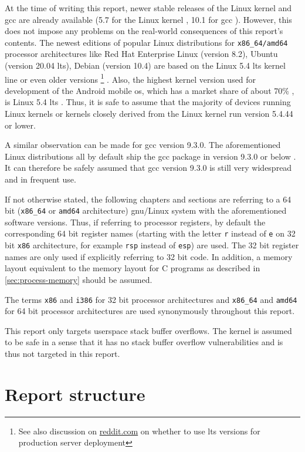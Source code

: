 At the time of writing this report, newer stable releases of the Linux kernel and \gls{gcc} are already available (5.7 for the Linux kernel \cite{LKO2020a}, 10.1 for \gls{gcc} \cite{FSF2020}).
However, this does not impose any problems on the real-world consequences of this report's contents.
The newest editions of popular Linux distributions for \texttt{x86\_64/amd64} processor architectures like Red Hat Enterprise Linux (version 8.2), Ubuntu (version 20.04 \gls{lts}), Debian (version 10.4) are based on the Linux 5.4 \gls{lts} kernel line or even older versions%
	\footnote{See also discussion on \href{https://www.reddit.com/r/webhosting/comments/beg0z0/should_i_use_an_lts_version_of_ubuntu_for_my_web/}{reddit.com} on whether to use \gls{lts} versions for production server deployment}
\cite{RedHat2020,Canonical2020,SPI2020,SPI2020a}.
Also, the highest kernel version used for development of the Android mobile \gls{os}, which has a market share of about 70\% \cite{Statcounter2020}, is Linux 5.4 \gls{lts} \cite{GoogleLLC2020}.
Thus, it is safe to assume that the majority of devices running Linux kernels or kernels closely derived from the Linux kernel run version 5.4.44 or lower.

A similar observation can be made for \gls{gcc} version 9.3.0.
The aforementioned Linux distributions all by default ship the \gls{gcc} package in version 9.3.0 or below \cite{RedHat2020a,Canonical2020a,SPI2020b}.
It can therefore be safely assumed that \gls{gcc} version 9.3.0 is still very widespread and in frequent use.

If not otherwise stated, the following chapters and sections are referring to a 64 bit (\texttt{x86\_64} or \texttt{amd64} architecture) \acs{gnu}/Linux system with the aforementioned software versions.
Thus, if referring to processor registers, by default the corresponding 64 bit register names (starting with the letter \texttt{r} instead of \texttt{e} on 32 bit \texttt{x86} architecture, for example \texttt{rsp} instead of \texttt{esp}) are used.
The 32 bit register names are only used if explicitly referring to 32 bit code.
In addition, a memory layout equivalent to the memory layout for C programs as described in \cref{sec:process-memory} should be assumed.

The terms \texttt{x86} and \texttt{i386} for 32 bit processor architectures and \texttt{x86\_64} and \texttt{amd64} for 64 bit processor architectures are used synonymously throughout this report.

This report only targets userspace stack buffer overflows.
The kernel is assumed to be safe in a sense that it has no stack buffer overflow vulnerabilities and is thus not targeted in this report.

\section{Report structure}
\label{sec:report-structure}

